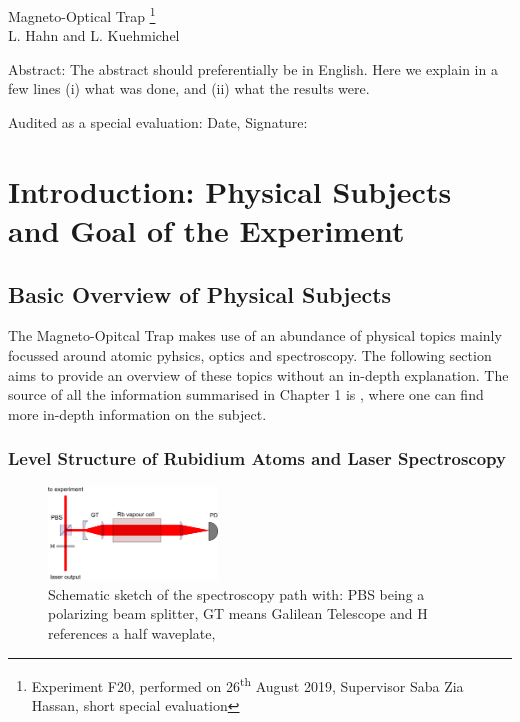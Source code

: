 \documentclass[12pt, a4paper]{article}
\begin{document}
\thispagestyle{empty}     %
\null\vspace{40mm}
\begin{center}
{%
\Large  Magneto-Optical Trap
\footnote{\noindent Experiment F20, performed on 26\textsuperscript{th} August 2019,
Supervisor Saba Zia Hassan,
short special evaluation}
}\\[15mm]
L. Hahn and L. Kuehmichel

\vspace{25mm}

\parbox{0.9\textwidth}{
Abstract:    
\small The abstract should preferentially be in English. Here we explain in a
few lines (i) what was done, and (ii) what the results were.
}
\end{center}

\vfill
Audited as a special evaluation: Date, Signature:
\vspace{20mm}

\null\thispagestyle{empty} 
   

\newpage

\section{Introduction: Physical Subjects and Goal of the Experiment}
\subsection{Basic Overview of Physical Subjects}
The Magneto-Opitcal Trap makes use of an abundance of physical topics mainly focussed around atomic pyhsics, optics and spectroscopy. The following section aims to provide an overview of these topics without an in-depth explanation. The source of all the information summarised in Chapter 1 is \cite{script}, where one can find more in-depth information on the subject.
\subsubsection{Level Structure of Rubidium Atoms and Laser Spectroscopy}
\begin{figure}
    \centering
    \parbox{0.4\textwidth}{
        \centering
        \includegraphics[width=0.4\textwidth]{800px-Doppler_spectroscopy.png}
    }

    \caption{Schematic sketch of the spectroscopy path with:  PBS being a polarizing beam splitter, GT means Galilean Telescope and H references a half waveplate, \cite{script}}
    \label{doppler_spect}
\end{figure}
\end{document}
